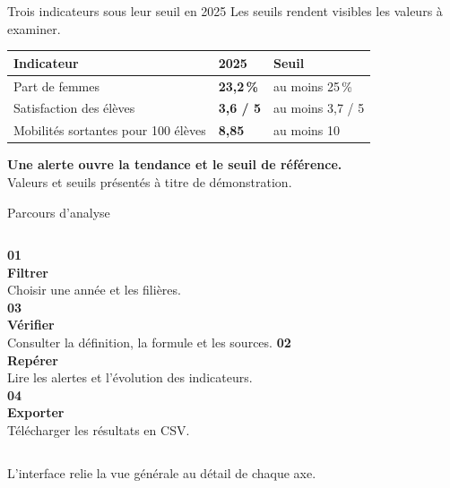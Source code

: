 \documentclass[aspectratio=169,12pt]{beamer}
\begin{document}
\begin{frame}{Trois indicateurs sous leur seuil en 2025}
  \vspace{0.26cm}
  {\Large Les seuils rendent visibles les valeurs à examiner.}
  \vspace{0.42cm}
  \renewcommand{\arraystretch}{1.58}
  {\large
  \begin{tabular}{@{}p{}p{}p{}@{}}
    {\color{ensiieGray}\textbf{Indicateur}} & {\color{ensiieGray}\textbf{2025}} & {\color{ensiieGray}\textbf{Seuil}} \\
    \hline
    Part de femmes & {\color{ensiieAlert}\textbf{23,2\,\%}} & au moins 25\,\% \\
    Satisfaction des élèves & {\color{ensiieAlert}\textbf{3,6 / 5}} & au moins 3,7 / 5 \\
    Mobilités sortantes pour 100 élèves & {\color{ensiieAlert}\textbf{8,85}} & au moins 10 \\
  \end{tabular}}
  \vspace{0.55cm}
  {\Large\bfseries\color{ensiieNavy}Une alerte ouvre la tendance et le seuil de référence.}\\[0.18cm]
  {\normalsize\color{ensiieGray}Valeurs et seuils présentés à titre de démonstration.}
\end{frame}

\begin{frame}{Parcours d'analyse}
  \vspace{0.26cm}
  \begin{columns}[T,onlytextwidth]
      {\fontsize{22}{26}\selectfont\bfseries\color{ensiieOrange}01}\\[-0.02cm]
      {\Large\bfseries Filtrer}\\[0.08cm]
      {\large\color{ensiieGray}Choisir une année et les filières.}\\[0.62cm]
      {\fontsize{22}{26}\selectfont\bfseries\color{ensiieOrange}03}\\[-0.02cm]
      {\Large\bfseries Vérifier}\\[0.08cm]
      {\large\color{ensiieGray}Consulter la définition, la formule et les sources.}
      {\fontsize{22}{26}\selectfont\bfseries\color{ensiieOrange}02}\\[-0.02cm]
      {\Large\bfseries Repérer}\\[0.08cm]
      {\large\color{ensiieGray}Lire les alertes et l'évolution des indicateurs.}\\[0.62cm]
      {\fontsize{22}{26}\selectfont\bfseries\color{ensiieOrange}04}\\[-0.02cm]
      {\Large\bfseries Exporter}\\[0.08cm]
      {\large\color{ensiieGray}Télécharger les résultats en CSV.}
  \end{columns}
  \vfill
  {\large L'interface relie la vue générale au détail de chaque axe.}
\end{frame}
\end{document}
